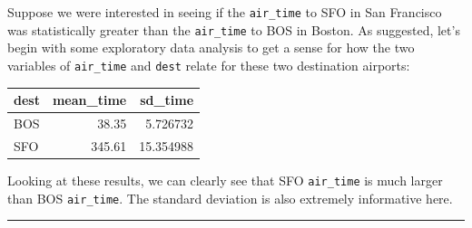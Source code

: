 \documentclass[]{tufte-book}
\newenvironment{Shaded}{\begin{snugshade}}{\end{snugshade}}
\newcommand{\KeywordTok}[1]{\textcolor[rgb]{0.13,0.29,0.53}{\textbf{{#1}}}}
\newcommand{\DataTypeTok}[1]{\textcolor[rgb]{0.13,0.29,0.53}{{#1}}}
\newcommand{\DecValTok}[1]{\textcolor[rgb]{0.00,0.00,0.81}{{#1}}}
\newcommand{\StringTok}[1]{\textcolor[rgb]{0.31,0.60,0.02}{{#1}}}
\newcommand{\NormalTok}[1]{{#1}}
\let\oldrule=\rule
\renewcommand{\rule}[1]{\oldrule{\linewidth}}
\begin{document}
\begin{Shaded}
\end{Shaded}

Suppose we were interested in seeing if the \texttt{air\_time} to SFO in
San Francisco was statistically greater than the \texttt{air\_time} to
BOS in Boston. As suggested, let's begin with some exploratory data
analysis to get a sense for how the two variables of \texttt{air\_time}
and \texttt{dest} relate for these two destination airports:

\begin{Shaded}
\end{Shaded}

\begin{tabular}{l|r|r}
\hline
dest & mean\_time & sd\_time\\
\hline
BOS & 38.35 & 5.726732\\
\hline
SFO & 345.61 & 15.354988\\
\hline
\end{tabular}

Looking at these results, we can clearly see that SFO \texttt{air\_time}
is much larger than BOS \texttt{air\_time}. The standard deviation is
also extremely informative here.

\begin{center}\rule{0.5\linewidth}{\linethickness}\end{center}
\end{document}
